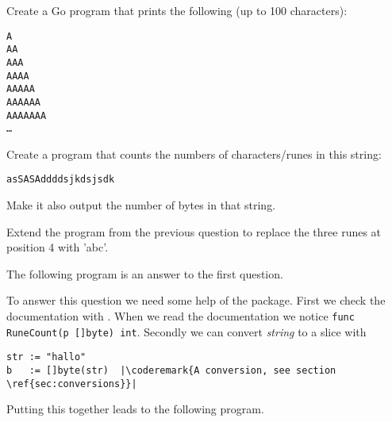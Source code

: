 \begin{Exercise}[title={Strings},difficulty=1]
\label{ex:strings}
\Question \label{ex:strings q1} Create a Go program that prints
the following (up to 100 characters):
\begin{alltt}
A
AA
AAA
AAAA
AAAAA
AAAAAA
AAAAAAA
\ldots
\end{alltt}


\Question \label{ex:strings q2} Create a program that counts
the numbers of characters/runes in this string:
\begin{alltt}
asSASA ddd dsjkdsjs dk
\end{alltt}
Make it also output the number of bytes in that string.

\Question \label{ex:string q3} Extend the program from
the previous question to replace the three runes at
position 4 with 'abc'.

\end{Exercise}

\begin{Answer}

\Question The following program is an answer to the first question.


\Question To answer this question we need some help of
the  package. First we check the documentation
with . When we read the documentation
we notice \lstinline{func RuneCount(p []byte) int}. Secondly
we can convert \emph{string} to a  slice with
\begin{lstlisting}
str := "hallo"
b   := []byte(str)  |\coderemark{A conversion, see section \ref{sec:conversions}}|
\end{lstlisting}

Putting this together leads to the following program.

\end{Answer}
